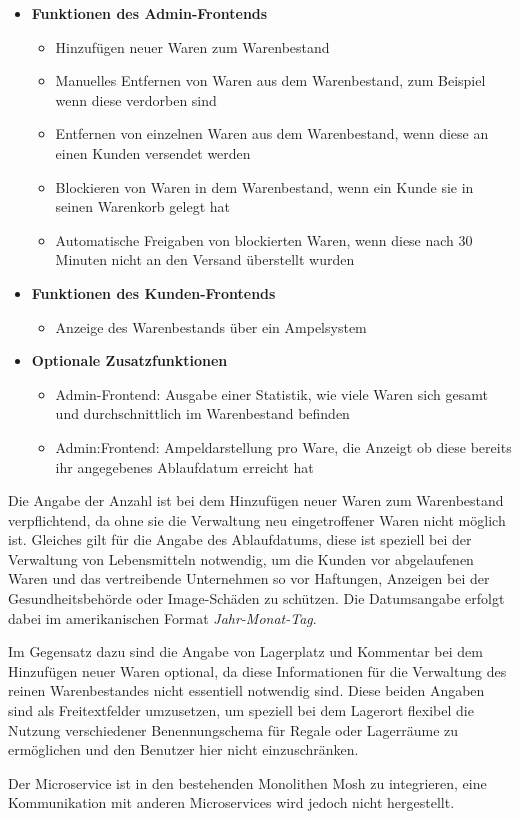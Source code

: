 \begin{itemize}
	\item \textbf{Funktionen des Admin-Frontends}
	\begin{itemize}
		\item Hinzufügen neuer Waren zum Warenbestand
		\item Manuelles Entfernen von Waren aus dem Warenbestand, zum Beispiel wenn diese verdorben sind
		\item Entfernen von einzelnen Waren aus dem Warenbestand, wenn diese an einen Kunden versendet werden
		\item Blockieren von Waren in dem Warenbestand, wenn ein Kunde sie in seinen Warenkorb gelegt hat
		\item Automatische Freigaben von blockierten Waren, wenn diese nach 30 Minuten nicht an den Versand überstellt wurden
	\end{itemize}
	\item \textbf{Funktionen des Kunden-Frontends}
	\begin{itemize}
		\item Anzeige des Warenbestands über ein Ampelsystem
	\end{itemize}
	\item \textbf{Optionale Zusatzfunktionen}
	\begin{itemize}
		\item Admin-Frontend: Ausgabe einer Statistik, wie viele Waren sich gesamt und durchschnittlich im Warenbestand befinden 
		\item Admin:Frontend: Ampeldarstellung pro Ware, die Anzeigt ob diese bereits ihr angegebenes Ablaufdatum erreicht hat
	\end{itemize}
\end{itemize}

Die Angabe der Anzahl ist bei dem Hinzufügen neuer Waren zum Warenbestand verpflichtend, da ohne sie die Verwaltung neu eingetroffener Waren nicht möglich ist. Gleiches gilt für die Angabe des Ablaufdatums, diese ist speziell bei der Verwaltung von Lebensmitteln notwendig, um die Kunden vor abgelaufenen Waren und das vertreibende Unternehmen so vor Haftungen, Anzeigen bei der Gesundheitsbehörde oder Image-Schäden zu schützen. Die Datumsangabe erfolgt dabei im amerikanischen Format \textit{Jahr-Monat-Tag}. \par 
Im Gegensatz dazu sind die Angabe von Lagerplatz und Kommentar bei dem Hinzufügen neuer Waren optional, da diese Informationen für die Verwaltung des reinen Warenbestandes nicht essentiell notwendig sind. Diese beiden Angaben sind als Freitextfelder umzusetzen, um speziell bei dem Lagerort flexibel die Nutzung verschiedener Benennungschema für Regale oder Lagerräume zu ermöglichen und den Benutzer hier nicht einzuschränken. \par 
Der Microservice ist in den bestehenden Monolithen Mosh zu integrieren, eine Kommunikation mit anderen Microservices wird jedoch nicht hergestellt.